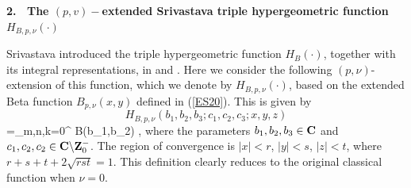\begin{center}
{\bf 2. \ The $(p,v)-$extended Srivastava triple hypergeometric function $H_{B,p,\nu}(\cdot)$ }
\end{center}
\setcounter{section}{2}
\setcounter{equation}{0}
\renewcommand{\theequation}{\arabic{section}.\arabic{equation}}
Srivastava introduced the triple hypergeometric function $H_{B}(\cdot)$, together with its integral representations, in \cite{AB34} and \cite{AB36}. Here we consider the following  $(p,\nu)$-extension of this function, which we denote by $H_{B,p,\nu}(\cdot)$, based on the extended Beta
function $B_{p,\nu}(x,y)$ defined in (\ref{ES20}). This is given by
\[H_{B,p,\nu}(b_{1},b_{2},b_{3};c_{1},c_{2},c_{3};x,y,z)\]
\bee\label{PV16} =\sum_{m,n,k=0}^{\infty}
{B(b_{1},b_{2})} ,
\ee
where the parameters $b_{1},b_{2},b_{3}\in{\bf C}$ and  $c_{1},c_{2}, c_{2}\in{\bf C}\backslash {\bf Z}_{0}^{-}$. The region of convergence is $|x|<r$, $|y|<s$, $|z|<t$, where $r+s+t+2\sqrt{rst}=1$.
This definition clearly reduces to the original classical function when $\nu=0$.

